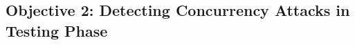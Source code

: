 






\vspace{-.15in}\subsection{Objective 2: Detecting Concurrency Attacks in 
Testing Phase}\label{sec:detect}\vspace{-.075in}


